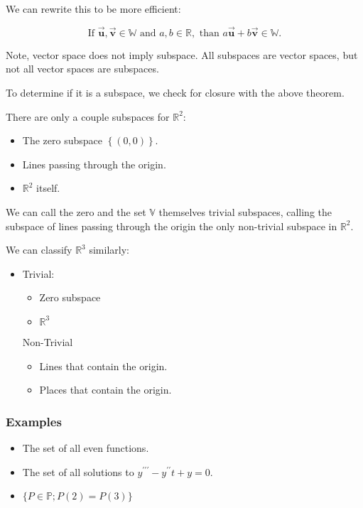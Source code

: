 \documentclass[12pt,landscape,twocolumn]{article}
\let\oldvec\vec
\renewcommand{\vec}[1]{\oldvec{\mathbf{ #1 } } }                    %
\begin{document}
    We can rewrite this to be more efficient:

    \begin{equation}\label{eq:subspace_closure}
        \text{If } \vec{u}, \vec{v} \in \mathbb{W} \text{ and } a, b \in \mathbb{R}, \text{ than } a\vec{u} + b\vec{v} \in \mathbb{W}.
    \end{equation}

    Note, vector space does not imply subspace. All subspaces are vector spaces, but not all vector spaces are subspaces.

    To determine if it is a subspace, we check for closure with the above theorem.

    There are only a couple subspaces for $\mathbb{R}^2$:
    \begin{itemize}
        \item The zero subspace $\left\{ (0, 0) \right\}$.
        \item Lines passing through the origin.
        \item $\mathbb{R}^2$ itself.
    \end{itemize}

    We can call the zero and the set $\mathbb{V}$ themselves trivial subspaces, calling the subspace of lines passing through the origin the only non-trivial subspace in $\mathbb{R}^2$.

    We can classify $\mathbb{R}^3$ similarly:
    \begin{itemize}
    \item Trivial:
        \begin{itemize}
        \item Zero subspace
        \item $\mathbb{R}^3$
        \end{itemize}
    Non-Trivial
        \begin{itemize}
        \item Lines that contain the origin.
        \item Places that contain the origin.
        \end{itemize}
    \end{itemize}

        \subsubsection{Examples}
        \begin{itemize}
        \item The set of all even functions.
        \item The set of all solutions to $y^{\prime\prime\prime} - y^{\prime\prime} t + y = 0$.
        \item $\{P \in \mathbb{P}; P(2) = P(3)\}$
        \end{itemize}
\end{document}
